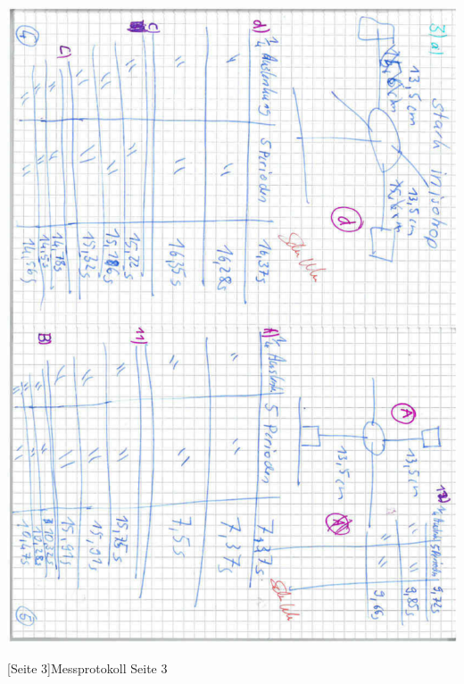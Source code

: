 \documentclass[12pt,a4paper,]{scrreprt}
\begin{document}
        \begin{center}
   		 	\includegraphics[scale=0.7]{3.pdf}
   	 	\end{center}
    	[Seite 3]{Messprotokoll Seite 3}
    	\pagebreak
    	
\end{document}
